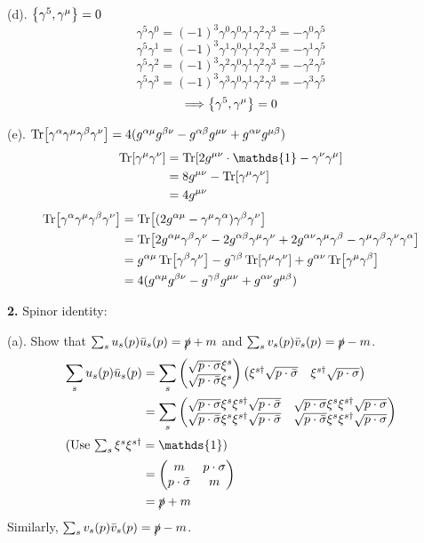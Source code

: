 \documentclass{article}
\newcommand{\gm}{\gamma^{\mu}}
\newcommand{\gn}{\gamma^{\nu}}
\newcommand{\g}{\gamma}
\renewcommand{\a}{\alpha}
\renewcommand{\b}{\beta}
\newcommand{\p}{\phi}
\newcommand{\ps}{\slashed p}
\begin{document}
(d). $\Bqty{\g^5,\g^{\mu}}=0$
$$\g^5\g^0=(-1)^3\g^0\g^0\g^1\g^2\g^3=-\g^0\g^5$$
$$\g^5\g^1=(-1)^3\g^1\g^0\g^1\g^2\g^3=-\g^1\g^5$$
$$\g^5\g^2=(-1)^3\g^2\g^0\g^1\g^2\g^3=-\g^2\g^5$$
$$\g^5\g^3=(-1)^3\g^3\g^0\g^1\g^2\g^3=-\g^3\g^5$$
$$\Longrightarrow\Bqty{\g^5,\g^{\mu}}=0$$

(e). $\Tr[\g^{\a}\gm\g^{\b}\gn]=4(g^{\a\mu}g^{\b\nu}-g^{\a\b}g^{\mu\nu}+g^{\a\nu}g^{\mu\b})$
\begin{align*}
  \Tr[\gm\gn]&=\Tr[2g^{\mu\nu}\cdot\mathds{1}-\gn\gm]\\
  &=8g^{\mu\nu}-\Tr[\gm\gn]
\\
&=4g^{\mu\nu}
\end{align*}
\begin{align*}
  \Tr[\g^{\a}\gm\g^{\b}\gn]&=\Tr[(2g^{\a\mu}-\gm\g^{\a})\g^{\b}\gn]\\
  &=\Tr[2g^{\a\mu}\g^{\b}\gn-2g^{\a\b}\gm\gn+2g^{\a\nu}\gm\g^{\b}-\gm\g^{\b}\gn\g^{\a}]\\&=g^{\a\mu}\Tr[\g^{\b}\gn]-g^{\g\b}\Tr[\gm\gn]+g^{\a\nu}\Tr[\gm\g^{\b}]\\
  &=4(g^{\a\mu}g^{\b\nu}-g^{\g\b}g^{\mu\nu}+g^{\a\nu}g^{\mu\b})\\
\end{align*}

{\bf2.}\quad
Spinor identity:

(a). Show that $\sum_su_s(p)\bar u_s(p)=\ps+m$ and $\sum_sv_s(p)\bar v_s(p)=\ps-m$.
\begin{align*}
  \sum_su_s(p)\bar u_s(p)&=\sum_s\pmqty{\sqrt{p\cdot\sigma}\xi^s\\\sqrt{p\cdot\bar\sigma}\xi^s}\pmqty{\xi^{s\dagger}\sqrt{p\cdot\bar\sigma}&\xi^{s\dagger}\sqrt{p\cdot\sigma}}\\
  &=\sum_s\pmqty{\sqrt{p\cdot\sigma}\xi^s\xi^{s\dagger}\sqrt{p\cdot\bar\sigma}&\sqrt{p\cdot\sigma}\xi^s\xi^{s\dagger}\sqrt{p\cdot\sigma}\\\sqrt{p\cdot\bar\sigma}\xi^s\xi^{s\dagger}\sqrt{p\cdot\bar\sigma}&\sqrt{p\cdot\bar\sigma}\xi^s\xi^{s\dagger}\sqrt{p\cdot\sigma}}\\
  \intertext{(Use $\sum_s\xi^s\xi^{s\dagger}=\mathds{1}$)}
  &=\pmqty{m&p\cdot\sigma\\p\cdot\bar\sigma&m}\\
  &=\ps+m
\end{align*}
Similarly, $\sum_sv_s(p)\bar v_s(p)=\ps-m$.
\end{document}
